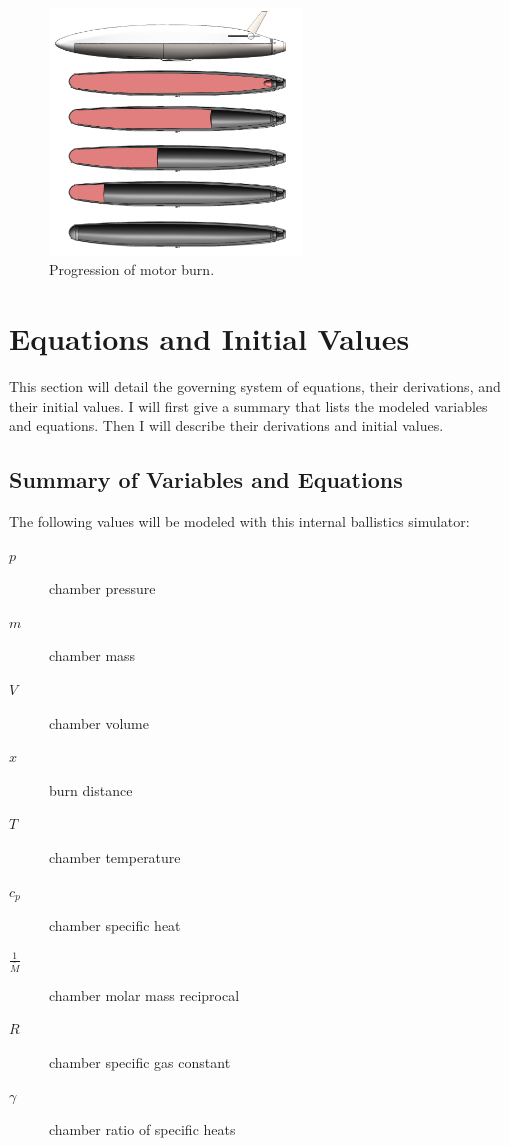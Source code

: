 \documentclass[12pt, letterpaper]{article}
\begin{document}
\begin{figure}
    \centering
    \includegraphics[width=0.6\textwidth]{burn_progress}
    \caption{\label{fig:burn_progress} Progression of motor burn.}
\end{figure}


\section{Equations and Initial Values}

This section will detail the governing system of equations, their derivations, and their initial values. I will first give a summary that lists the modeled variables and equations. Then I will describe their derivations and initial values.

\subsection{Summary of Variables and Equations}

The following values will be modeled with this internal ballistics simulator:

\begin{description}
\item [$p$] chamber pressure
\item [$m$] chamber mass
\item [$V$] chamber volume
\item [$x$] burn distance
\item [$T$] chamber temperature
\item [$c_p$] chamber specific heat
\item [$\frac{1}{\bar{M}}$] chamber molar mass reciprocal
\item [$R$] chamber specific gas constant
\item [$\gamma$] chamber ratio of specific heats
\end{description}
\end{document}
